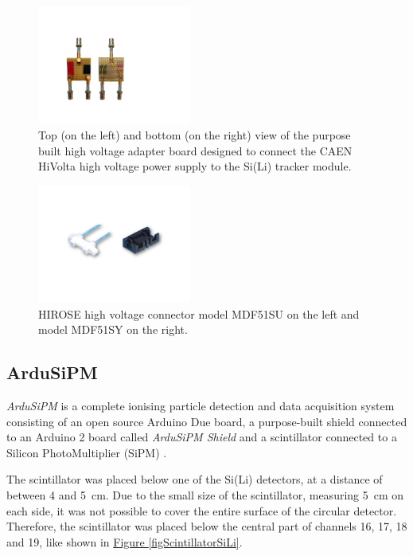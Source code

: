 \par


\begin{figure}[h!]
    \centering
    \includegraphics[width=0.45\textwidth]{Images/chap3/hivoltage_adapter_board.pdf}
    \caption{Top (on the left) and bottom (on the right) view of the purpose built high voltage adapter board designed to connect the CAEN HiVolta high voltage power supply to the Si(Li) tracker module.}
    \label{figHiVoltAdapterBoard}
\end{figure}

\begin{figure}[h!]
    \centering
    \includegraphics[width=0.45\textwidth]{Images/chap3/connectors_high_voltage.pdf}
    \caption{HIROSE high voltage connector model MDF51SU on the left and model MDF51SY on the right.}
    \label{figHVPSconn}
\end{figure}


\subsection{ArduSiPM}
\label{secArduSiPM}
\textit{ArduSiPM} is a complete ionising particle detection and data acquisition system consisting of an open source Arduino Due board, a purpose-built shield connected to an Arduino 2 board called \textit{ArduSiPM Shield} and a scintillator connected to a Silicon PhotoMultiplier (SiPM) \cite{bocci_2015_particle}. 

\par
The scintillator was placed below one of the Si(Li) detectors, at a distance of between 4 and \SI{5}{\cm}. Due to the small size of the scintillator, measuring \SI{5}{\cm} on each side, it was not possible to cover the entire surface of the circular detector. Therefore, the scintillator was placed below the central part of channels 16, 17, 18 and 19, like shown in \hyperref[figScintillatorSiLi]{Figure \ref{figScintillatorSiLi}}.

